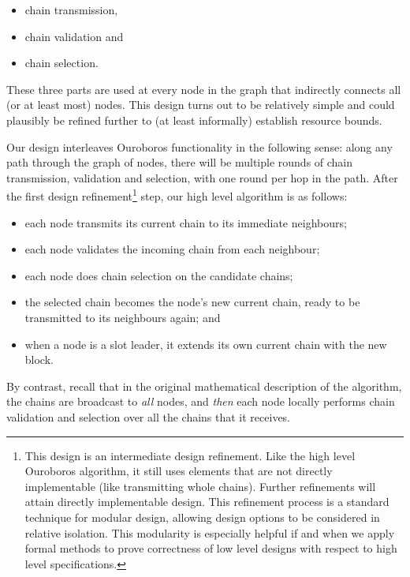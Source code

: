 \documentclass[11pt,a4paper]{article}
\begin{document}
\begin{itemize}
\item
  chain transmission,
\item
  chain validation and
\item
  chain selection.
\end{itemize}

These three parts are used at every node in the graph that indirectly
connects all (or at least most) nodes. This design turns out to be
relatively simple and could plausibly be refined further to (at least
informally) establish resource bounds.

Our design interleaves Ouroboros functionality in the following sense:
along any path through the graph of nodes, there will be multiple rounds
of chain transmission, validation and selection, with one round per hop
in the path. After the first design refinement\footnote{This design is
  an intermediate design refinement. Like the high level Ouroboros
  algorithm, it still uses elements that are not directly implementable
  (like transmitting whole chains). Further refinements will attain
  directly implementable design. This refinement process is a standard
  technique for modular design, allowing design options to be considered
  in relative isolation. This modularity is especially helpful if and
  when we apply formal methods to prove correctness of low level designs
  with respect to high level specifications.} step, our high level
algorithm is as follows:

\begin{itemize}
\item
  each node transmits its current chain to its immediate neighbours;
\item
  each node validates the incoming chain from each neighbour;
\item
  each node does chain selection on the candidate chains;
\item
  the selected chain becomes the node's new current chain, ready to be
  transmitted to its neighbours again; and
\item
  when a node is a slot leader, it extends its own current chain with
  the new block.
\end{itemize}

By contrast, recall that in the original mathematical description of the
algorithm, the chains are broadcast to \emph{all} nodes, and \emph{then}
each node locally performs chain validation and selection over all the
chains that it receives.
\end{document}
